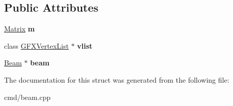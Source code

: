 \subsection*{Public Attributes}
\begin{DoxyCompactItemize}
\item 
\hyperlink{classMatrix}{Matrix} {\bfseries m}\hypertarget{structBeamDrawContext_ab8ffd1d66d8f9fa501a1cefb96e345b2}{}\label{structBeamDrawContext_ab8ffd1d66d8f9fa501a1cefb96e345b2}

\item 
class \hyperlink{classGFXVertexList}{G\+F\+X\+Vertex\+List} $\ast$ {\bfseries vlist}\hypertarget{structBeamDrawContext_aee5863e179b5cfdcec6072f4bc0d3228}{}\label{structBeamDrawContext_aee5863e179b5cfdcec6072f4bc0d3228}

\item 
\hyperlink{classBeam}{Beam} $\ast$ {\bfseries beam}\hypertarget{structBeamDrawContext_a8beaec8473a4cafd014dd45bdc7d4f3c}{}\label{structBeamDrawContext_a8beaec8473a4cafd014dd45bdc7d4f3c}

\end{DoxyCompactItemize}


The documentation for this struct was generated from the following file\+:\begin{DoxyCompactItemize}
\item 
cmd/beam.\+cpp\end{DoxyCompactItemize}
